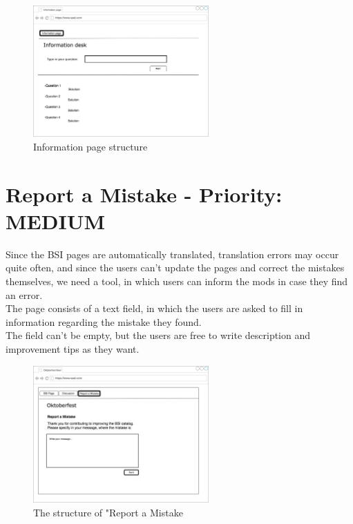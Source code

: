 \begin{figure}[h] 
    \centering
    \includegraphics[width=0.6\textwidth]{Pictures/information2.jpg}
    \caption{Information page structure}
\end{figure} 

\section{Report a Mistake  - Priority: MEDIUM}

Since the BSI pages are automatically translated, translation errors may occur quite often, and since the users can't update the pages and correct the mistakes themselves, we need a tool, in which users can inform the mods in case they find an error. \\
The page consists of a text field, in which the users are asked to fill in information regarding the mistake they found.\\
The field can't be empty, but the users are free to write description and improvement tips as they want.

\begin{figure}[h] 
    \centering
    \includegraphics[width=0.6\textwidth]{Pictures/report1.jpg}
    \caption{The structure of "Report a Mistake}
\end{figure} 

